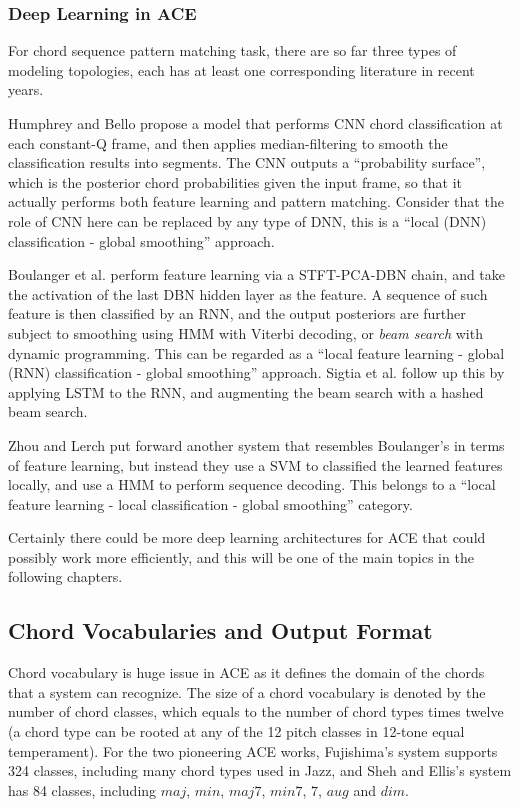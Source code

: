 \subsubsection{Deep Learning in ACE}
For chord sequence pattern matching task, there are so far three types of modeling topologies, each has at least one corresponding literature in recent years.

Humphrey and Bello \cite{humphrey2012rethinking} propose a model that performs CNN chord classification at each constant-Q frame, and then applies median-filtering to smooth the classification results into segments. The CNN outputs a ``probability surface'', which is the posterior chord probabilities given the input frame, so that it actually performs both feature learning and pattern matching. Consider that the role of CNN here can be replaced by any type of DNN, this is a ``local (DNN) classification - global smoothing'' approach.

Boulanger et al. \cite{boulanger2013audio} perform feature learning via a STFT-PCA-DBN chain, and take the activation of the last DBN hidden layer as the feature. A sequence of such feature is then classified by an RNN, and the output posteriors are further subject to smoothing using HMM with Viterbi decoding, or {\it beam search} with dynamic programming. This can be regarded as a ``local feature learning - global (RNN) classification - global smoothing'' approach. Sigtia et al. \cite{sigtia2015audio} follow up this by applying LSTM to the RNN, and augmenting the beam search with a hashed beam search.

Zhou and Lerch \cite{zhou2015chord} put forward another system that resembles Boulanger's in terms of feature learning, but instead they use a SVM to classified the learned features locally, and use a HMM to perform sequence decoding. This belongs to a ``local feature learning - local classification - global smoothing'' category.

Certainly there could be more deep learning architectures for ACE that could possibly work more efficiently, and this will be one of the main topics in the following chapters.

\subsection{Chord Vocabularies and Output Format} \label{sec:2-vocab}
Chord vocabulary is huge issue in ACE as it defines the domain of the chords that a system can recognize. The size of a chord vocabulary is denoted by the number of chord classes, which equals to the number of chord types times twelve (a chord type can be rooted at any of the 12 pitch classes in 12-tone equal temperament). For the two pioneering ACE works, Fujishima's system \cite{fujishima1999realtime} supports 324 classes, including many chord types used in Jazz, and Sheh and Ellis's system \cite{sheh2003chord} has 84 classes, including $maj$, $min$, $maj7$, $min7$, $7$, $aug$ and $dim$.

